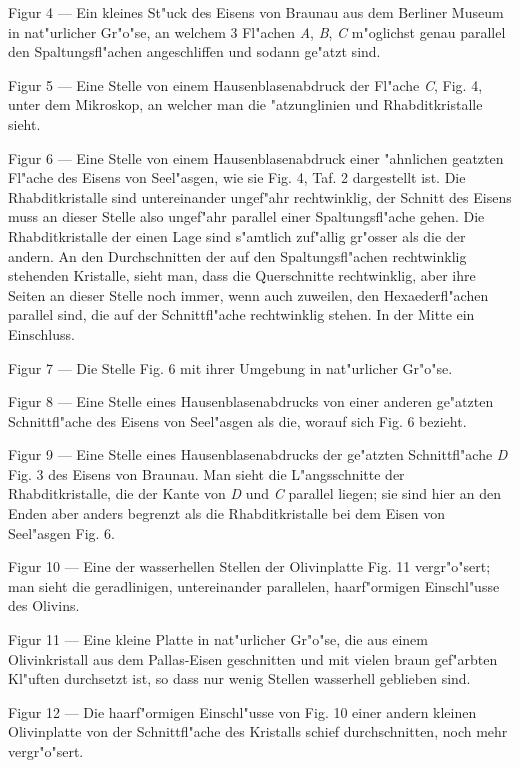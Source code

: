 \documentclass[a4paper, 11pt, oneside]{article}
\begin{document}
Figur 4 --- Ein kleines St"uck des Eisens von Braunau aus dem Berliner Museum in nat"urlicher Gr"o"se, an welchem 3 Fl"achen \emph{A}, \emph{B}, \emph{C} m"oglichst genau parallel den Spaltungsfl"achen angeschliffen und sodann ge"atzt sind.

Figur 5 --- Eine Stelle von einem Hausenblasenabdruck der Fl"ache \emph{C}, Fig. 4, unter dem Mikroskop, an welcher man die "atzunglinien und Rhabditkristalle sieht.

Figur 6 --- Eine Stelle von einem Hausenblasenabdruck einer "ahnlichen geatzten Fl"ache des Eisens von Seel"asgen, wie sie Fig. 4, Taf. 2 dargestellt ist. Die Rhabditkristalle sind untereinander ungef"ahr rechtwinklig, der Schnitt des Eisens muss an dieser Stelle also ungef"ahr parallel einer Spaltungsfl"ache gehen. Die Rhabditkristalle der einen Lage sind s"amtlich zuf"allig gr"osser als die der andern. An den Durchschnitten der auf den Spaltungsfl"achen rechtwinklig stehenden Kristalle, sieht man, dass die Querschnitte rechtwinklig, aber ihre Seiten an dieser Stelle noch immer, wenn auch zuweilen, den Hexaederfl"achen parallel sind, die auf der Schnittfl"ache rechtwinklig stehen. In der Mitte ein Einschluss.

Figur 7 --- Die Stelle Fig. 6 mit ihrer Umgebung in nat"urlicher Gr"o"se.

Figur 8 --- Eine Stelle eines Hausenblasenabdrucks von einer anderen ge"atzten Schnittfl"ache des Eisens von Seel"asgen als die, worauf sich Fig. 6 bezieht.

Figur 9 --- Eine Stelle eines Hausenblasenabdrucks der ge"atzten Schnittfl"ache \emph{D} Fig. 3 des Eisens von Braunau. Man sieht die L"angsschnitte der Rhabditkristalle, die der Kante von \emph{D} und \emph{C} parallel liegen; sie sind hier an den Enden aber anders begrenzt als die Rhabditkristalle bei dem Eisen von Seel"asgen Fig. 6.

Figur 10 --- Eine der wasserhellen Stellen der Olivinplatte Fig. 11 vergr"o"sert; man sieht die geradlinigen, untereinander parallelen, haarf"ormigen Einschl"usse des Olivins.

Figur 11 --- Eine kleine Platte in nat"urlicher Gr"o"se, die aus einem Olivinkristall aus dem Pallas-Eisen geschnitten und mit vielen braun gef"arbten Kl"uften durchsetzt ist, so dass nur wenig Stellen wasserhell geblieben sind.

Figur 12 --- Die haarf"ormigen Einschl"usse von Fig. 10 einer andern kleinen Olivinplatte von der Schnittfl"ache des Kristalls schief durchschnitten, noch mehr vergr"o"sert.
\end{document}
